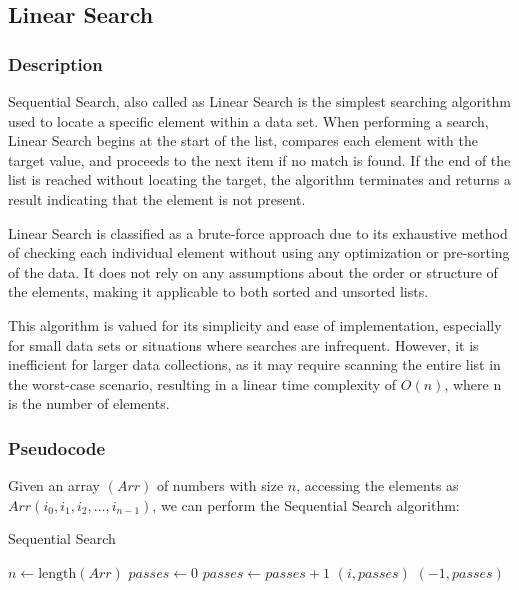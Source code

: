 \subsection{Linear Search}
\subsubsection{Description}

Sequential Search, also called as Linear Search is the simplest searching algorithm used to locate a specific element within a data set. When performing a search, Linear Search begins at the start of the list, compares each element with the target value, and proceeds to the next item if no match is found. If the end of the list is reached without locating the target, the algorithm terminates and returns a result indicating that the element is not present.

Linear Search is classified as a brute-force approach due to its exhaustive method of checking each individual element without using any optimization or pre-sorting of the data. It does not rely on any assumptions about the order or structure of the elements, making it applicable to both sorted and unsorted lists.

This algorithm is valued for its simplicity and ease of implementation, especially for small data sets or situations where searches are infrequent. However, it is inefficient for larger data collections, as it may require scanning the entire list in the worst-case scenario, resulting in a linear time complexity of $O(n)$, where n is the number of elements.

\pagebreak
\subsubsection{Pseudocode}
Given an array $(Arr)$ of numbers with size $n$, accessing the elements as $Arr(i_0, i_1, i_2,\dots, i_{n-1})$, we can perform the Sequential Search algorithm:

\begin{algorithm} [H]
    \caption{Sequential Search}
    \begin{algorithmic}
    \State{} $n \gets \text{length}(Arr)$
    \State{} $passes \gets 0$
        \State{} $passes \gets passes + 1$
            \State{} \Return{} $(i, passes)$
        \EndIf{}
    \EndFor{}
    \State{} \Return{} $(-1, passes)$
    \end{algorithmic}
\end{algorithm}

